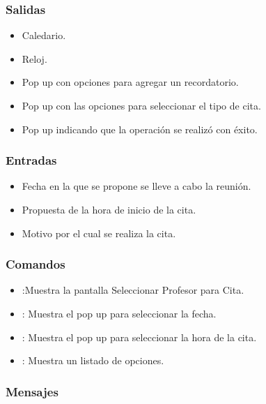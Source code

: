 
\subsubsection{Salidas}
	\begin{itemize}
		\item Caledario.
		\item Reloj.
		\item Pop up con opciones para agregar un recordatorio.
		\item Pop up con las opciones para seleccionar el tipo de cita.
		\item Pop up indicando que la operación se realizó con éxito.
	\end{itemize}

\subsubsection{Entradas}

\begin{itemize}
	
	\item Fecha en la que se propone se lleve a cabo la reunión.
	\item Propuesta de la hora de inicio de la cita.
	\item Motivo por el cual se realiza la cita.
\end{itemize}

\subsubsection{Comandos}
\begin{itemize}
	\item {}:Muestra la pantalla Seleccionar Profesor para Cita.
	\item {}: Muestra el pop up para seleccionar la fecha.
	\item {}: Muestra el pop up para seleccionar la hora de 
	la cita.
	\item {}: Muestra un listado de opciones.
\end{itemize}

\subsubsection{Mensajes}
\begin{Citemize}
	\item {}
	\item {}
\end{Citemize}

